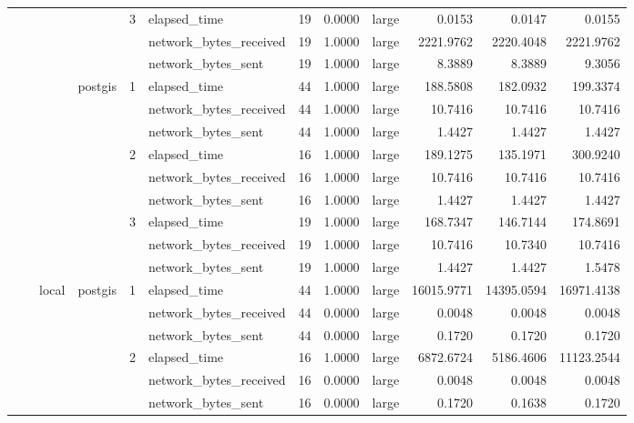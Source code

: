 \begin{tabular}{llllllrrlrrr}
\cline{5-12}
 &  &  &  & \multirow[t]{3}{*}{3} & elapsed_time & 19 & 0.0000 & large & 0.0153 & 0.0147 & 0.0155 \\
 &  &  &  &  & network_bytes_received & 19 & 1.0000 & large & 2221.9762 & 2220.4048 & 2221.9762 \\
 &  &  &  &  & network_bytes_sent & 19 & 1.0000 & large & 8.3889 & 8.3889 & 9.3056 \\
\cline{4-12} \cline{5-12}
 &  &  & \multirow[t]{9}{*}{postgis} & \multirow[t]{3}{*}{1} & elapsed_time & 44 & 1.0000 & large & 188.5808 & 182.0932 & 199.3374 \\
 &  &  &  &  & network_bytes_received & 44 & 1.0000 & large & 10.7416 & 10.7416 & 10.7416 \\
 &  &  &  &  & network_bytes_sent & 44 & 1.0000 & large & 1.4427 & 1.4427 & 1.4427 \\
\cline{5-12}
 &  &  &  & \multirow[t]{3}{*}{2} & elapsed_time & 16 & 1.0000 & large & 189.1275 & 135.1971 & 300.9240 \\
 &  &  &  &  & network_bytes_received & 16 & 1.0000 & large & 10.7416 & 10.7416 & 10.7416 \\
 &  &  &  &  & network_bytes_sent & 16 & 1.0000 & large & 1.4427 & 1.4427 & 1.4427 \\
\cline{5-12}
 &  &  &  & \multirow[t]{3}{*}{3} & elapsed_time & 19 & 1.0000 & large & 168.7347 & 146.7144 & 174.8691 \\
 &  &  &  &  & network_bytes_received & 19 & 1.0000 & large & 10.7416 & 10.7340 & 10.7416 \\
 &  &  &  &  & network_bytes_sent & 19 & 1.0000 & large & 1.4427 & 1.4427 & 1.5478 \\
\cline{3-12} \cline{4-12} \cline{5-12}
 &  & \multirow[t]{9}{*}{local} & \multirow[t]{9}{*}{postgis} & \multirow[t]{3}{*}{1} & elapsed_time & 44 & 1.0000 & large & 16015.9771 & 14395.0594 & 16971.4138 \\
 &  &  &  &  & network_bytes_received & 44 & 0.0000 & large & 0.0048 & 0.0048 & 0.0048 \\
 &  &  &  &  & network_bytes_sent & 44 & 0.0000 & large & 0.1720 & 0.1720 & 0.1720 \\
\cline{5-12}
 &  &  &  & \multirow[t]{3}{*}{2} & elapsed_time & 16 & 1.0000 & large & 6872.6724 & 5186.4606 & 11123.2544 \\
 &  &  &  &  & network_bytes_received & 16 & 0.0000 & large & 0.0048 & 0.0048 & 0.0048 \\
 &  &  &  &  & network_bytes_sent & 16 & 0.0000 & large & 0.1720 & 0.1638 & 0.1720 \\

\end{tabular}
